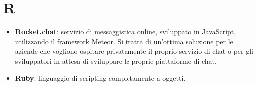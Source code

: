 \section{R}
\begin{itemize}
	\item \textbf{Rocket.chat}: servizio di messaggistica online, sviluppato in JavaScript, utilizzando il framework Meteor. Si tratta di un'ottima soluzione per le aziende che vogliono ospitare privatamente il proprio servizio di chat o per gli sviluppatori in attesa di sviluppare le proprie piattaforme di chat.
	\item \textbf{Ruby}: linguaggio di scripting completamente a oggetti.
\end{itemize}